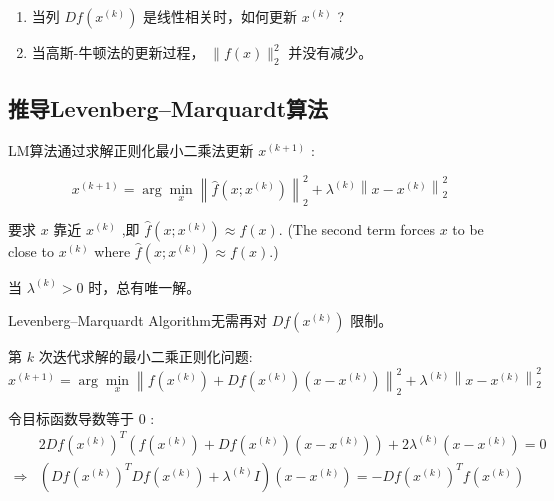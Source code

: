 \begin{enumerate}
    \item 当列 $ D f\left(x^{(k)}\right) $ 是线性相关时，如何更新 $ x^{(k)} $ ?
    \item 当高斯-牛顿法的更新过程， $ \|f(x)\|_{2}^{2} $ 并没有减少。
\end{enumerate}

\subsection{推导Levenberg–Marquardt算法}

LM算法通过求解正则化最小二乘法更新 $ x^{(k+1)} $ :

\begin{problem}
    \begin{equation}
    x^{(k+1)}=\arg \min _{x}\left\|\hat{f}\left(x ; x^{(k)}\right)\right\|_{2}^{2}+\lambda^{(k)}\left\|x-x^{(k)}\right\|_{2}^{2}
    \end{equation}

要求 $ x $ 靠近 $ x^{(k)} $ ,即 $ \hat{f}\left(x ; x^{(k)}\right) \approx f(x) $. (The second term forces $ x $ to be close to $ x^{(k)} $ where $ \hat{f}\left(x ; x^{(k)}\right) \approx f(x) $.)
\end{problem}

当 $ \lambda^{(k)}>0 $ 时，总有唯一解。

\begin{remark}
    Levenberg–Marquardt Algorithm无需再对 $Df \left(x^{(k)}\right) $ 限制。
\end{remark}

\begin{problem}
    第 $ k $ 次迭代求解的最小二乘正则化问题:
\begin{equation}
x^{(k+1)}=\arg \min _{x}\left\|f\left(x^{(k)}\right)+D f\left(x^{(k)}\right)\left(x-x^{(k)}\right)\right\|_{2}^{2}+\lambda^{(k)}\left\|x-x^{(k)}\right\|_{2}^{2}
\end{equation}
\end{problem}



令目标函数导数等于 0 :
\begin{equation}
\begin{aligned}
    & 2Df\left( x^{(k)}\right)^{T}\left( f\left( x^{(k)}\right) +Df\left( x^{(k)}\right)\left( x-x^{(k)}\right)\right) +2\lambda ^{(k)}\left( x-x^{(k)}\right) =0\\
   \Rightarrow  & \left( Df\left( x^{(k)}\right)^{T} Df\left( x^{(k)}\right) +\lambda ^{(k)} I\right)\left( x-x^{(k)}\right) =-Df\left( x^{(k)}\right)^{T} f\left( x^{(k)}\right)
   \end{aligned}
\end{equation}

